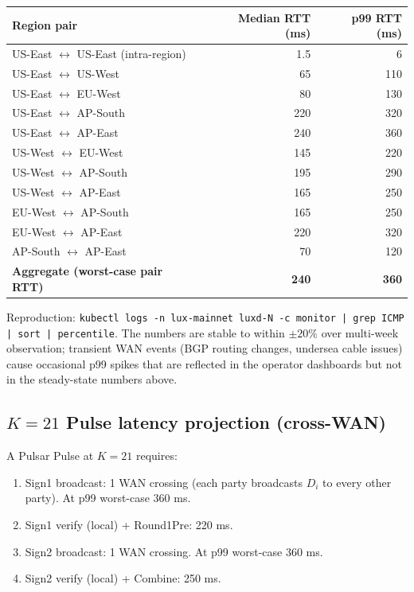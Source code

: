 \begin{tabular}{@{}lrr@{}}
  \toprule
  \textbf{Region pair} & \textbf{Median RTT (ms)} & \textbf{p99 RTT (ms)} \\
  \midrule
  US-East $\leftrightarrow$ US-East (intra-region) & 1.5 & 6 \\
  US-East $\leftrightarrow$ US-West              & 65 & 110 \\
  US-East $\leftrightarrow$ EU-West              & 80 & 130 \\
  US-East $\leftrightarrow$ AP-South             & 220 & 320 \\
  US-East $\leftrightarrow$ AP-East              & 240 & 360 \\
  US-West $\leftrightarrow$ EU-West              & 145 & 220 \\
  US-West $\leftrightarrow$ AP-South             & 195 & 290 \\
  US-West $\leftrightarrow$ AP-East              & 165 & 250 \\
  EU-West $\leftrightarrow$ AP-South             & 165 & 250 \\
  EU-West $\leftrightarrow$ AP-East              & 220 & 320 \\
  AP-South $\leftrightarrow$ AP-East             & 70 & 120 \\
  \midrule
  \textbf{Aggregate (worst-case pair RTT)} & \textbf{240} & \textbf{360} \\
  \bottomrule
\end{tabular}

Reproduction: \texttt{kubectl logs -n lux-mainnet luxd-N -c monitor | grep ICMP | sort | percentile}. The numbers are stable to within $\pm 20\%$ over multi-week observation; transient WAN events (BGP routing changes, undersea cable issues) cause occasional p99 spikes that are reflected in the operator dashboards but not in the steady-state numbers above.

\subsection{$K = 21$ Pulse latency projection (cross-WAN)}

A Pulsar Pulse at $K = 21$ requires:
\begin{enumerate}[leftmargin=2em,nosep]
  \item Sign1 broadcast: 1 WAN crossing (each party broadcasts $D_i$ to every other party). At p99 worst-case 360 ms.
  \item Sign1 verify (local) + Round1Pre: 220 ms.
  \item Sign2 broadcast: 1 WAN crossing. At p99 worst-case 360 ms.
  \item Sign2 verify (local) + Combine: 250 ms.
\end{enumerate}

